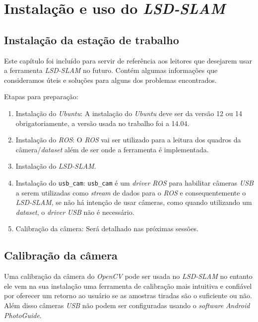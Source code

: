 \chapter{Instalação e uso do \textit{LSD-SLAM}}

\renewcommand{\tablename}{Listagem}

\section{Instalação da estação de trabalho}

Este capítulo foi incluído para servir de referência aos leitores que desejarem usar a ferramenta \textit{LSD-SLAM} no futuro. Contém algumas informações que consideramos úteis e soluções para alguns dos problemas encontrados.

Etapas para preparação:

\begin{enumerate}
	\item{Instalação do \textit{Ubuntu}: A instalação do \textit{Ubuntu} deve ser da versão 12 ou 14 obrigatoriamente, a versão usada no trabalho foi a 14.04.}
	\item{Instalação do  \textit{ROS}: O \textit{ROS} vai ser utilizado para a leitura dos quadros da câmera/\textit{dataset} além de ser onde a ferramenta é implementada.\cite{ROS-Tutorial}}
	\item{Instalação do \textit{LSD-SLAM}.\cite{GitHub-LSD-SLAM}}
	\item{Instalação do  \texttt{usb\_cam}: \texttt{usb\_cam} é um \textit{driver} \textit{ROS} para habilitar câmeras \textit{USB} a serem utilizadas como \textit{stream} de dados para o \textit{ROS} e consequentemente o \textit{LSD-SLAM}, se não há intenção de usar câmeras, como quando utilizando um \textit{dataset}, o \textit{driver} \textit{USB} não é necessário.}
	\item{Calibração da câmera: Será detalhado nas próximas sessões.}
\end{enumerate}

\section{Calibração da câmera}

Uma calibração da câmera do \textit{OpenCV} pode ser usada no \textit{LSD-SLAM} no entanto ele vem na sua instalação uma ferramenta de calibração mais intuitiva e confiável por oferecer um retorno ao usuário se as amostras tiradas são o suficiente ou não. Além disso câmeras \textit{USB} não podem ser configuradas usando o \textit{software} \textit{Android} \textit{PhotoGuide}.


